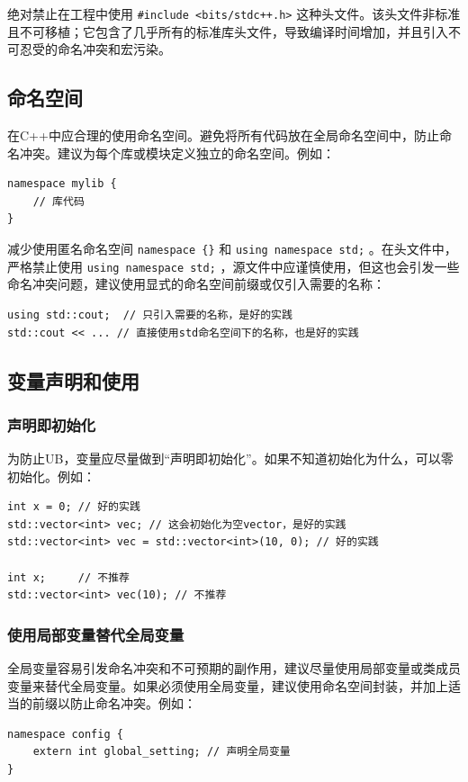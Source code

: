 绝对禁止在工程中使用 \texttt{\#include <bits/stdc++.h>} 这种头文件。该头文件非标准且不可移植；它包含了几乎所有的标准库头文件，导致编译时间增加，并且引入不可忍受的命名冲突和宏污染。

\subsection{命名空间}

在C++中应合理的使用命名空间。避免将所有代码放在全局命名空间中，防止命名冲突。建议为每个库或模块定义独立的命名空间。例如：
\begin{verbatim}
namespace mylib {
    // 库代码
}
\end{verbatim}

减少使用匿名命名空间 \texttt{namespace \{\}} 和 \texttt{using namespace std;} 。在头文件中，严格禁止使用 \texttt{using namespace std;} ，源文件中应谨慎使用，但这也会引发一些命名冲突问题，建议使用显式的命名空间前缀或仅引入需要的名称：
\begin{verbatim}
using std::cout;  // 只引入需要的名称，是好的实践
std::cout << ... // 直接使用std命名空间下的名称，也是好的实践
\end{verbatim}

\subsection{变量声明和使用}

\subsubsection{声明即初始化}

为防止UB，变量应尽量做到“声明即初始化”。如果不知道初始化为什么，可以零初始化。例如：
\begin{verbatim}
int x = 0; // 好的实践
std::vector<int> vec; // 这会初始化为空vector，是好的实践 
std::vector<int> vec = std::vector<int>(10, 0); // 好的实践

int x;     // 不推荐
std::vector<int> vec(10); // 不推荐
\end{verbatim}

\subsubsection{使用局部变量替代全局变量}

全局变量容易引发命名冲突和不可预期的副作用，建议尽量使用局部变量或类成员变量来替代全局变量。如果必须使用全局变量，建议使用命名空间封装，并加上适当的前缀以防止命名冲突。例如：
\begin{verbatim}
namespace config {
    extern int global_setting; // 声明全局变量
}
\end{verbatim}

